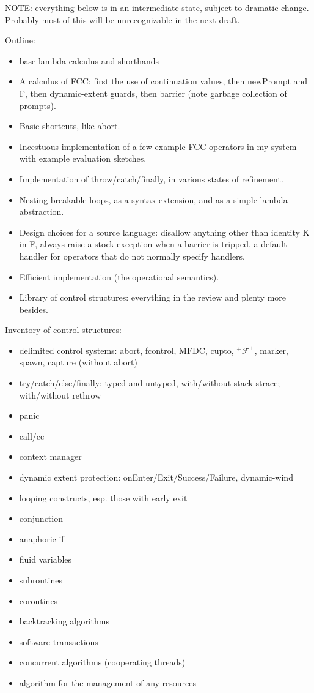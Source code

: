 \documentclass[11pt]{article}
\newcommand\F{\mathcal{F}}
\newcommand\pmFpm{^\pm\F^\pm}
\begin{document}
NOTE: everything below is in an intermediate state, subject to dramatic change. Probably most of this will be unrecognizable in the next draft.

Outline:
\begin{itemize}
\item base lambda calculus and shorthands
\item A calculus of FCC: first the use of continuation values, then newPrompt and F, then dynamic-extent guards, then barrier (note garbage collection of prompts).
\item Basic shortcuts, like abort.
\item Incestuous implementation of a few example FCC operators in my system  with example evaluation sketches.
\item Implementation of throw/catch/finally, in various states of refinement.
\item Nesting breakable loops, as a syntax extension, and as a simple lambda abstraction.
\item Design choices for a source language: disallow anything other than identity K in F, always raise a stock exception when a barrier is tripped, a default handler for operators that do not normally specify handlers.
\item Efficient implementation (the operational semantics).
\item Library of control structures: everything in the review and plenty more besides.
\end{itemize}

Inventory of control structures:
\begin{itemize}
\item delimited control systems: abort, fcontrol, MFDC, cupto, $\pmFpm$, marker, spawn, capture (without abort)
\item try/catch/else/finally: typed and untyped, with/without stack strace; with/without rethrow
\item panic
\item call/cc
\item context manager
\item dynamic extent protection: onEnter/Exit/Success/Failure, dynamic-wind
\item looping constructs, esp. those with early exit
\item conjunction
\item anaphoric if
\item fluid variables
\item subroutines
\item coroutines
\item backtracking algorithms
\item software transactions
\item concurrent algorithms (cooperating threads)
\item algorithm for the management of any resources
\end{itemize}
\end{document}
